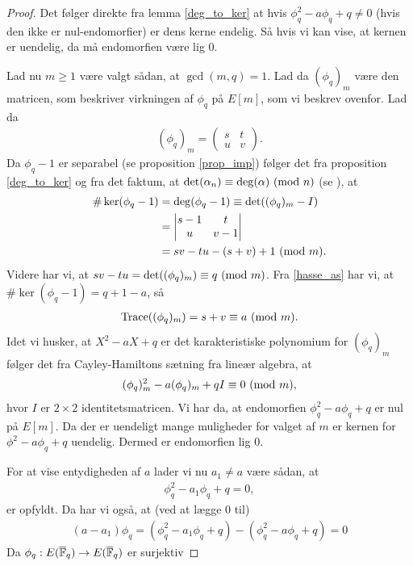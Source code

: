 \begin{proof}
Det følger direkte fra lemma \ref{deg_to_ker} at hvis $\phi_{q}^{2} -a \phi_q + q \neq 0$ (hvis den ikke er nul-endomorfier) er dens kerne endelig. Så hvis vi kan vise, at kernen er uendelig, da må endomorfien være lig $0$.

Lad nu $m \geq 1$ være valgt sådan, at $\gcd(m, q) = 1$. Lad da $(\phi_q)_m$ være den matricen, som beskriver virkningen af $\phi_q$ på $E[m]$, som vi beskrev ovenfor. Lad da
\begin{align*}
	(\phi_q)_m = \left( 
	\begin{matrix}
		s & t \\
		u & v
	\end{matrix} \right).
\end{align*}
Da $\phi_q - 1$ er separabel (se proposition \ref{prop_imp}) følger det fra proposition \ref{deg_to_ker} og fra det faktum, at $\det(\alpha_n) \equiv \deg(\alpha) \ (\mathrm{mod} \ n)$ (se \cite[proposition~3.15]{Washington}), at
\begin{align*}
	\# \ker (\phi_q - 1) &= \deg(\phi_q - 1) \equiv \det((\phi_q)_m - I) \\ 
	&= 
	\left| \begin{matrix}
		s-1 & t \\
		u & v - 1 
	\end{matrix} \right| \\
	&= sv - tu - (s + v) + 1 \ (\mathrm{mod} \ m).
\end{align*}
Videre har vi, at $sv-tu = \det((\phi_q)_m) \equiv q \ (\mathrm{mod} \ m)$. Fra \eqref{hasse_as} har vi, at 
$\# \ker(\phi_q - 1) = q + 1 - a$, så
\begin{align*}
	\text{Trace}((\phi_q)_m) = s + v \equiv a \ (\mathrm{mod} \ m).
\end{align*}
Idet vi husker, at $X^2 - aX + q$ er det karakteristiske polynomium for $(\phi_q)_m$ følger det fra
Cayley-Hamiltons sætning fra lineær algebra, at
\begin{align*}
	(\phi_q)_{m}^{2} - a(\phi_q)_m + qI \equiv 0 \ (\mathrm{mod} \ m),
\end{align*}
hvor $I$ er $2 \times 2$ identitetsmatricen. Vi har da, at endomorfien $\phi_{q}^{2} -a\phi_q + q$ er nul på $E[m]$. Da der er uendeligt mange muligheder for valget af $m$ er kernen for ${\phi}^2 - a\phi_q + q$ uendelig. Dermed er endomorfien lig $0$.

For at vise entydigheden af $a$ lader vi nu $a_1 \neq a$ være sådan, at 
\begin{align*}
	\phi_{q}^{2} - a_1 \phi_q + q = 0,
\end{align*}
er opfyldt. Da har vi også, at (ved at lægge $0$ til)
\begin{align*}
	(a - a_1) \phi_q = (\phi_{q}^{2} - a_1 \phi_q + q) - (\phi_{q}^{2} - a\phi_q + q) = 0
\end{align*}
Da $\phi_q : E(\overline{\mathbb{F}}_q) \to E(\overline{\mathbb{F}}_q)$ er surjektiv 
\end{proof}

